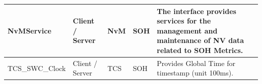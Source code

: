 \begin{longtable}{|l|l|l|l|l|}
\begin{minipage}{0.42\linewidth}\raggedright\vspace{.75ex}NvMService\vspace{.75ex}\end{minipage} & \begin{minipage}{0.07\linewidth}\raggedright\vspace{.75ex}Client / Server\vspace{.75ex}\end{minipage} & \begin{minipage}{0.10\linewidth}\raggedright\vspace{.75ex}NvM\vspace{.75ex}\end{minipage} & \begin{minipage}{0.10\linewidth}\raggedright\vspace{.75ex}SOH\vspace{.75ex}\end{minipage} & \begin{minipage}{0.17\linewidth}\raggedright\vspace{.75ex}The interface provides services for the management and maintenance of NV data related to SOH Metrics.\vspace{.75ex}\end{minipage}\\\hline
\begin{minipage}{0.42\linewidth}\raggedright\vspace{.75ex}TCS\_SWC\_Clock\vspace{.75ex}\end{minipage} & \begin{minipage}{0.07\linewidth}\raggedright\vspace{.75ex}Client / Server\vspace{.75ex}\end{minipage} & \begin{minipage}{0.10\linewidth}\raggedright\vspace{.75ex}TCS\vspace{.75ex}\end{minipage} & \begin{minipage}{0.10\linewidth}\raggedright\vspace{.75ex}SOH\vspace{.75ex}\end{minipage} & \begin{minipage}{0.17\linewidth}\raggedright\vspace{.75ex}Provides Global Time for timestamp (unit 100ms).\vspace{.75ex}\end{minipage}\\\hline

\end{longtable}
